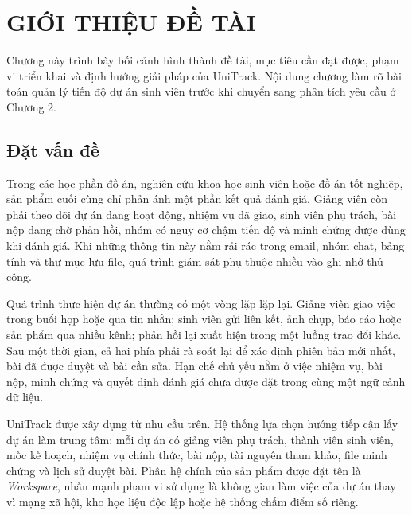 \chapter{GIỚI THIỆU ĐỀ TÀI}

Chương này trình bày bối cảnh hình thành đề tài, mục tiêu cần đạt được, phạm vi triển khai và định hướng giải pháp của UniTrack. Nội dung chương làm rõ bài toán quản lý tiến độ dự án sinh viên trước khi chuyển sang phân tích yêu cầu ở Chương 2.

\section{Đặt vấn đề}

Trong các học phần đồ án, nghiên cứu khoa học sinh viên hoặc đồ án tốt nghiệp, sản phẩm cuối cùng chỉ phản ánh một phần kết quả đánh giá. Giảng viên còn phải theo dõi dự án đang hoạt động, nhiệm vụ đã giao, sinh viên phụ trách, bài nộp đang chờ phản hồi, nhóm có nguy cơ chậm tiến độ và minh chứng được dùng khi đánh giá. Khi những thông tin này nằm rải rác trong email, nhóm chat, bảng tính và thư mục lưu file, quá trình giám sát phụ thuộc nhiều vào ghi nhớ thủ công.

Quá trình thực hiện dự án thường có một vòng lặp lặp lại. Giảng viên giao việc trong buổi họp hoặc qua tin nhắn; sinh viên gửi liên kết, ảnh chụp, báo cáo hoặc sản phẩm qua nhiều kênh; phản hồi lại xuất hiện trong một luồng trao đổi khác. Sau một thời gian, cả hai phía phải rà soát lại để xác định phiên bản mới nhất, bài đã được duyệt và bài cần sửa. Hạn chế chủ yếu nằm ở việc nhiệm vụ, bài nộp, minh chứng và quyết định đánh giá chưa được đặt trong cùng một ngữ cảnh dữ liệu.

UniTrack được xây dựng từ nhu cầu trên. Hệ thống lựa chọn hướng tiếp cận lấy dự án làm trung tâm: mỗi dự án có giảng viên phụ trách, thành viên sinh viên, mốc kế hoạch, nhiệm vụ chính thức, bài nộp, tài nguyên tham khảo, file minh chứng và lịch sử duyệt bài. Phân hệ chính của sản phẩm được đặt tên là \textit{Workspace}, nhấn mạnh phạm vi sử dụng là không gian làm việc của dự án thay vì mạng xã hội, kho học liệu độc lập hoặc hệ thống chấm điểm số riêng.

